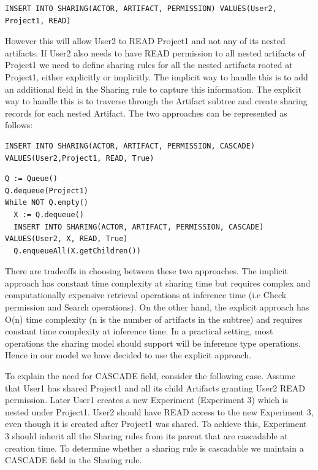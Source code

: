 \documentclass[sigconf]{acmart}
\begin{document}
\begin{lstlisting} 
INSERT INTO SHARING(ACTOR, ARTIFACT, PERMISSION) VALUES(User2, Project1, READ)
\end{lstlisting}

However this will allow User2 to READ Project1 and not any of its nested artifacts. If User2 also needs to have READ permission to all nested artifacts of Project1 we need to define sharing rules for all the nested artifacts rooted at Project1, either explicitly or implicitly. The implicit way to handle this is to add an additional field in the Sharing rule to capture this information. The explicit way to handle this is to traverse through the Artifact subtree and create sharing records for each nested Artifact. The two approaches can be represented as follows:

\begin{lstlisting} 
INSERT INTO SHARING(ACTOR, ARTIFACT, PERMISSION, CASCADE) VALUES(User2,Project1, READ, True)
\end{lstlisting}

\begin{lstlisting} 
Q := Queue()
Q.dequeue(Project1)
While NOT Q.empty()
  X := Q.dequeue()
  INSERT INTO SHARING(ACTOR, ARTIFACT, PERMISSION, CASCADE) VALUES(User2, X, READ, True)
  Q.enqueueAll(X.getChildren())
\end{lstlisting}

There are tradeoffs in choosing between these two approaches. The implicit approach has constant time complexity at sharing time but requires complex and computationally expensive retrieval operations at inference time (i.e Check permission and Search operations). On the other hand, the explicit approach has O(n) time complexity (n is the number of artifacts in the subtree) and requires constant time complexity at inference time. In a practical setting, most operations the sharing model should support will be inference type operations. Hence in our model we have decided to use the explicit approach.

To explain the need for CASCADE field, consider the following case. Assume that User1 has shared Project1 and all its child Artifacts granting User2 READ permission. Later User1 creates a new Experiment (Experiment 3) which is nested under Project1. User2 should have READ access to the new Experiment 3, even though it is created after Project1 was shared. To achieve this, Experiment 3 should inherit all the Sharing rules from its parent that  are cascadable at creation time. To determine whether a sharing rule is cascadable we maintain a CASCADE field in the Sharing rule.
\end{document}
